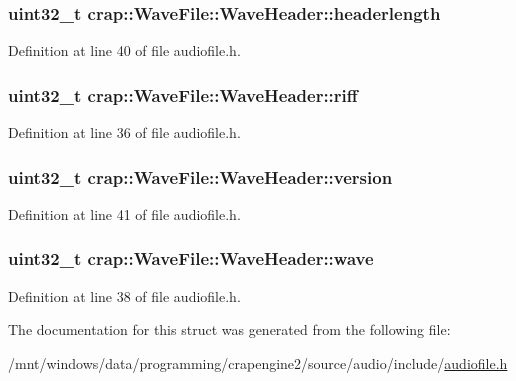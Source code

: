 \subsubsection[{headerlength}]{\setlength{\rightskip}{0pt plus 5cm}uint32\+\_\+t crap\+::\+Wave\+File\+::\+Wave\+Header\+::headerlength}\label{structcrap_1_1_wave_file_1_1_wave_header_a9b09473da66dc65a81f3af08246cc7b4}


Definition at line 40 of file audiofile.\+h.

\hypertarget{structcrap_1_1_wave_file_1_1_wave_header_abf32e05680132afe847f29671bd0b039}{}
\subsubsection[{riff}]{\setlength{\rightskip}{0pt plus 5cm}uint32\+\_\+t crap\+::\+Wave\+File\+::\+Wave\+Header\+::riff}\label{structcrap_1_1_wave_file_1_1_wave_header_abf32e05680132afe847f29671bd0b039}


Definition at line 36 of file audiofile.\+h.

\hypertarget{structcrap_1_1_wave_file_1_1_wave_header_ac2091625d4920909edeee79423f884b1}{}
\subsubsection[{version}]{\setlength{\rightskip}{0pt plus 5cm}uint32\+\_\+t crap\+::\+Wave\+File\+::\+Wave\+Header\+::version}\label{structcrap_1_1_wave_file_1_1_wave_header_ac2091625d4920909edeee79423f884b1}


Definition at line 41 of file audiofile.\+h.

\hypertarget{structcrap_1_1_wave_file_1_1_wave_header_a4d2d3de7ee47f37c098224695afc9ced}{}
\subsubsection[{wave}]{\setlength{\rightskip}{0pt plus 5cm}uint32\+\_\+t crap\+::\+Wave\+File\+::\+Wave\+Header\+::wave}\label{structcrap_1_1_wave_file_1_1_wave_header_a4d2d3de7ee47f37c098224695afc9ced}


Definition at line 38 of file audiofile.\+h.



The documentation for this struct was generated from the following file\+:\begin{DoxyCompactItemize}
\item 
/mnt/windows/data/programming/crapengine2/source/audio/include/\hyperlink{audiofile_8h}{audiofile.\+h}\end{DoxyCompactItemize}
